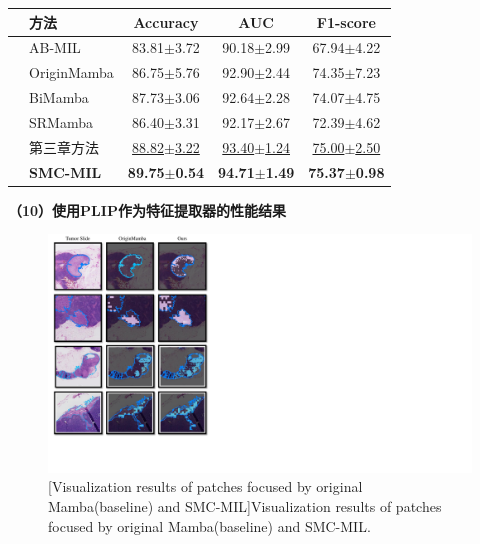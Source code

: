 \begin{table}[h!]
  \large    %
  \centering
  \begin{tabularx}{\textwidth}{clCCC}
    \toprule
    &方法  & Accuracy& AUC&F1-score\\ \midrule
    
    &AB-MIL  & 83.81$\pm$3.72 & 90.18$\pm$2.99 & 67.94$\pm$4.22\\
  &OriginMamba        & 86.75$\pm$5.76 & 92.90$\pm$2.44 & 74.35$\pm$7.23\\
  &BiMamba          & 87.73$\pm$3.06 & 92.64$\pm$2.28 & 74.07$\pm$4.75\\
  &SRMamba & 86.40$\pm$3.31 & 92.17$\pm$2.67 & 72.39$\pm$4.62\\
  &%
  第三章方法   & \underline{88.82$\pm$3.22} & \underline{93.40$\pm$1.24} & \underline{75.00$\pm$2.50}\\  
  &\textbf{SMC-MIL}        & \textbf{89.75$\pm$0.54} & \textbf{94.71$\pm$1.49} & \textbf{75.37$\pm$0.98}\\  

  \bottomrule
\end{tabularx}

  \label{table4: BRCA_PLIP}
\end{table}

\textbf{（10）使用PLIP作为特征提取器的性能结果}





\begin{figure}[h!]
  \centering
  \includegraphics[width=0.8\columnwidth]{figures/Visualize_cropped.pdf}
  [Visualization results of patches focused by original Mamba(baseline) and SMC-MIL]{Visualization results of patches focused by original Mamba(baseline) and SMC-MIL.}
  \label{figure4: visualize}
\end{figure}

